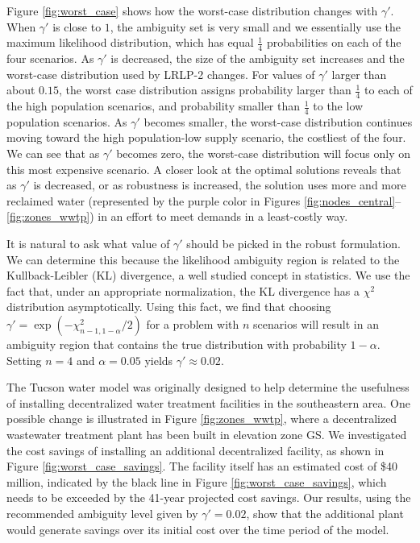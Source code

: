 \documentclass[12pt]{amsart}
\begin{document}
Figure \ref{fig:worst_case} shows how the worst-case distribution changes with $\gamma'$.
When $\gamma'$ is close to $1$, the ambiguity set is very small and we essentially use the maximum likelihood distribution, which has equal $\tfrac{1}{4}$ probabilities on each of the four scenarios.
As $\gamma'$ is decreased, the size of the ambiguity set increases and the worst-case distribution used by LRLP-2 changes.
For values of $\gamma'$ larger than about $0.15$, the worst case distribution assigns probability larger than $\tfrac{1}{4}$ to each of the high population scenarios, and probability smaller than $\tfrac{1}{4}$ to the low population scenarios.
As $\gamma'$ becomes smaller, the worst-case distribution continues moving toward the high population-low supply scenario, the costliest of the four.
We can see that as $\gamma'$ becomes zero, the worst-case distribution will focus only on this most expensive scenario.
A closer look at the optimal solutions reveals that as $\gamma'$ is decreased, or as robustness is increased, the solution uses more and more reclaimed water (represented by the purple color in Figures \ref{fig:nodes_central}--\ref{fig:zones_wwtp}) in an effort to meet demands in a least-costly way.

It is natural to ask what value of $\gamma'$ should be picked in the robust formulation.
We can determine this because the likelihood ambiguity region is related to the Kullback-Leibler (KL) divergence, a well studied concept in statistics.
We use the fact that, under an appropriate normalization, the KL divergence has a $\chi^2$ distribution asymptotically.
Using this fact, we find that choosing $\gamma' = \exp(-\chi^2_{n-1,1-\alpha}/2)$ for a problem with $n$ scenarios will result in an ambiguity region that contains the true distribution with probability $1-\alpha$.
Setting $n = 4$ and $\alpha = 0.05$ yields $\gamma' \approx 0.02$.

The Tucson water model was originally designed to help determine the usefulness of installing decentralized water treatment facilities in the southeastern area.
One possible change is illustrated in Figure \ref{fig:zones_wwtp}, where a decentralized wastewater treatment plant has been built in elevation zone GS.
We investigated the cost savings of installing an additional decentralized facility, as shown in Figure \ref{fig:worst_case_savings}.
The facility itself has an estimated cost of \$40 million, indicated by the black line in Figure \ref{fig:worst_case_savings}, which needs to be exceeded by the 41-year projected cost savings.
Our results, using the recommended ambiguity level given by $\gamma' = 0.02$, show that the additional plant would generate savings over its initial cost over the time period of the model.
\end{document}
